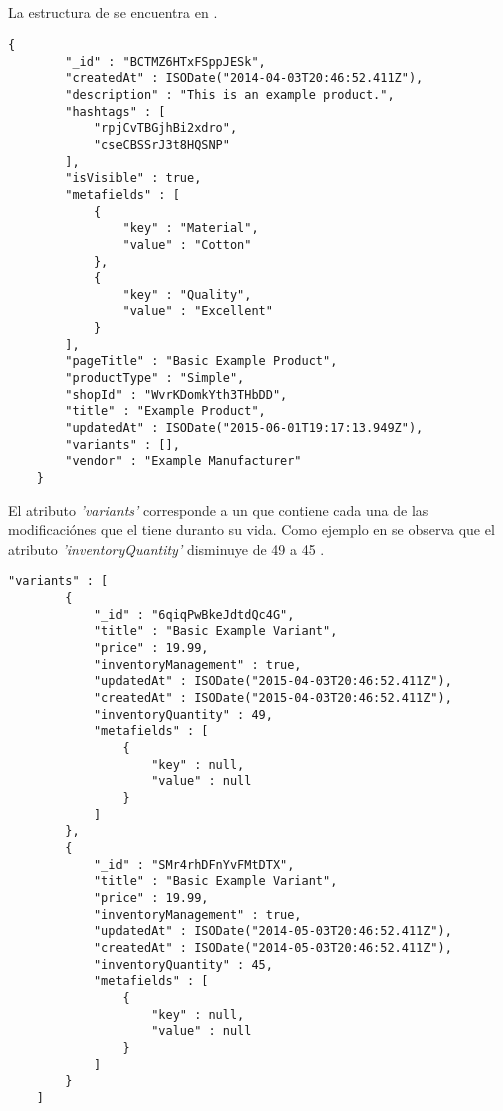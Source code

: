 \subsection{\itemcollection}

La estructura de \itemcollection se encuentra en .

\medskip
\begin{lstlisting}[caption= \dataModelAS de \itemcollection, label=source:javascript:data_model_item]
	{
	    "_id" : "BCTMZ6HTxFSppJESk",
	    "createdAt" : ISODate("2014-04-03T20:46:52.411Z"),
	    "description" : "This is an example product.",
	    "hashtags" : [ 
	        "rpjCvTBGjhBi2xdro", 
	        "cseCBSSrJ3t8HQSNP"
	    ],
	    "isVisible" : true,
	    "metafields" : [ 
	        {
	            "key" : "Material",
	            "value" : "Cotton"
	        }, 
	        {
	            "key" : "Quality",
	            "value" : "Excellent"
	        }
	    ],
	    "pageTitle" : "Basic Example Product",
	    "productType" : "Simple",
	    "shopId" : "WvrKDomkYth3THbDD",
	    "title" : "Example Product",
	    "updatedAt" : ISODate("2015-06-01T19:17:13.949Z"),
	    "variants" : [],
	    "vendor" : "Example Manufacturer"
	}
\end{lstlisting}

El atributo \textit{'variants'} corresponde a un \arrayPL que contiene cada una de las modificaciónes que el \itemCOM tiene duranto su vida. Como ejemplo en  se observa que el atributo \textit{'inventoryQuantity'} disminuye de 49 a 45 \itemsCOM.

\medskip
\begin{lstlisting}[caption= El \arrayPL "variants", label=source:javascript:data_model_item_variant]
	 "variants" : [ 
        {
            "_id" : "6qiqPwBkeJdtdQc4G",
            "title" : "Basic Example Variant",
            "price" : 19.99,
            "inventoryManagement" : true,
            "updatedAt" : ISODate("2015-04-03T20:46:52.411Z"),
            "createdAt" : ISODate("2015-04-03T20:46:52.411Z"),
            "inventoryQuantity" : 49,
            "metafields" : [ 
                {
                    "key" : null,
                    "value" : null
                }
            ]
        }, 
        {
            "_id" : "SMr4rhDFnYvFMtDTX",
            "title" : "Basic Example Variant",
            "price" : 19.99,
            "inventoryManagement" : true,
            "updatedAt" : ISODate("2014-05-03T20:46:52.411Z"),
            "createdAt" : ISODate("2014-05-03T20:46:52.411Z"),
            "inventoryQuantity" : 45,
            "metafields" : [ 
                {
                    "key" : null,
                    "value" : null
                }
            ]
        }
    ]
\end{lstlisting}



